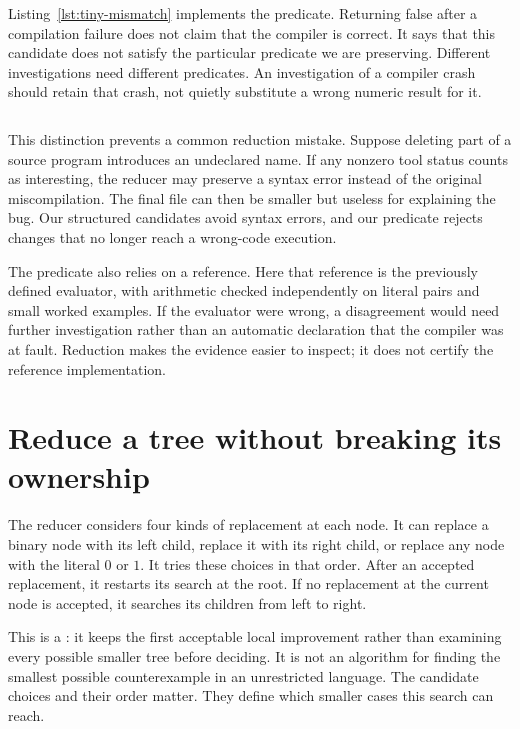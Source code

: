 Listing~\ref{lst:tiny-mismatch} implements the predicate.
Returning false after a compilation failure does not claim that the compiler is correct.
It says that this candidate does not satisfy the particular predicate we are preserving.
Different investigations need different predicates.
An investigation of a compiler crash should retain that crash, not quietly substitute a wrong numeric result for it.

\begin{listing}
  \inputminted[firstline=17,lastline=27]{c}{example-code/ch01/fault_lab.c}
  \caption{The predicate retains successful executions with disagreeing values.}
  \label{lst:tiny-mismatch}
\end{listing}

This distinction prevents a common reduction mistake.
Suppose deleting part of a source program introduces an undeclared name.
If any nonzero tool status counts as interesting, the reducer may preserve a syntax error instead of the original miscompilation.
The final file can then be smaller but useless for explaining the bug.
Our structured candidates avoid syntax errors, and our predicate rejects changes that no longer reach a wrong-code execution.

The predicate also relies on a reference.
Here that reference is the previously defined evaluator, with arithmetic checked independently on literal pairs and small worked examples.
If the evaluator were wrong, a disagreement would need further investigation rather than an automatic declaration that the compiler was at fault.
Reduction makes the evidence easier to inspect; it does not certify the reference implementation.

\section{Reduce a tree without breaking its ownership}
\label{sec:tiny-greedy-reducer}

The reducer considers four kinds of replacement at each node.
It can replace a binary node with its left child, replace it with its right child, or replace any node with the literal $0$ or $1$.
It tries these choices in that order.
After an accepted replacement, it restarts its search at the root.
If no replacement at the current node is accepted, it searches its children from left to right.

This is a : it keeps the first acceptable local improvement rather than examining every possible smaller tree before deciding.
It is not an algorithm for finding the smallest possible counterexample in an unrestricted language.
The candidate choices and their order matter.
They define which smaller cases this search can reach.

